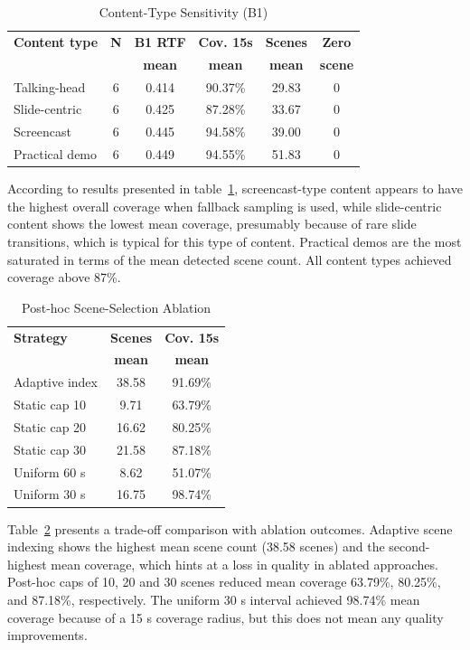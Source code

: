 ﻿\documentclass[conference]{IEEEtran}
\begin{document}
\begin{table}[t]
\caption{Content-Type Sensitivity (B1)}
\label{tab:content_sensitivity}
\centering
\footnotesize
\setlength{\tabcolsep}{4.2pt}
\begin{tabular}{lccccc}
\toprule
\textbf{Content type} & \textbf{N} & \textbf{B1 RTF} & \textbf{Cov. 15s} & \textbf{Scenes} & \textbf{Zero} \\
 &  & \textbf{mean} & \textbf{mean} & \textbf{mean} & \textbf{scene} \\
\midrule
Talking-head & 6 & 0.414 & 90.37\% & 29.83 & 0 \\
Slide-centric & 6 & 0.425 & 87.28\% & 33.67 & 0 \\
Screencast & 6 & 0.445 & 94.58\% & 39.00 & 0 \\
Practical demo & 6 & 0.449 & 94.55\% & 51.83 & 0 \\
\bottomrule
\end{tabular}
\end{table}

According to results presented in table~\ref{tab:content_sensitivity}, screencast-type content appears to have the highest overall coverage when fallback sampling is used, while slide-centric content shows the lowest mean coverage, presumably because of rare slide transitions, which is typical for this type of content. Practical demos are the most saturated in terms of the mean detected scene count. All content types achieved coverage above 87\%.

\begin{table}[t]
\caption{Post-hoc Scene-Selection Ablation}
\label{tab:scene_ablation}
\centering
\footnotesize
\setlength{\tabcolsep}{5pt}
\begin{tabular}{lcc}
\toprule
\textbf{Strategy} & \textbf{Scenes} & \textbf{Cov. 15s} \\
 & \textbf{mean} & \textbf{mean} \\
\midrule
Adaptive index & 38.58 & 91.69\% \\
Static cap 10 & 9.71 & 63.79\% \\
Static cap 20 & 16.62 & 80.25\% \\
Static cap 30 & 21.58 & 87.18\% \\
Uniform 60 s & 8.62 & 51.07\% \\
Uniform 30 s & 16.75 & 98.74\% \\
\bottomrule
\end{tabular}
\end{table}

Table~\ref{tab:scene_ablation} presents a trade-off comparison with ablation outcomes. Adaptive scene indexing shows the highest mean scene count (38.58 scenes) and the second-highest mean coverage, which hints at a loss in quality in ablated approaches. Post-hoc caps of 10, 20 and 30 scenes reduced mean coverage 63.79\%, 80.25\%, and 87.18\%, respectively. The uniform 30 s interval achieved 98.74\% mean coverage because of a 15 s coverage radius, but this does not mean any quality improvements.
\end{document}
